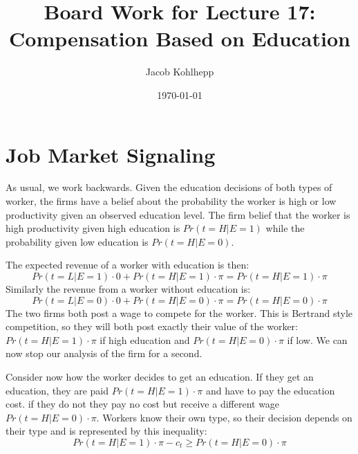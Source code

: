 \documentclass{article}
\title{Board Work for Lecture 17: Compensation Based on Education}
\author{Jacob Kohlhepp}
\date{\today}
\begin{document}
\maketitle


\section{Job Market Signaling}

As usual, we work backwards. Given the education decisions of both types of worker, the firms have a belief about the probability the worker is high or low productivity given an observed education level. The firm belief that the worker is high productivity given high education is $Pr(t=H|E=1)$ while the probability given low education is $Pr(t=H|E=0)$.

The expected revenue of a worker with education is then:
\[Pr(t=L|E=1) \cdot 0 + Pr(t=H|E=1)\cdot \pi =Pr(t=H|E=1)\cdot \pi\]
Similarly the revenue from a worker without education is:
\[Pr(t=L|E=0) \cdot 0 + Pr(t=H|E=0)\cdot \pi =Pr(t=H|E=0)\cdot \pi\]
The two firms both post a wage to compete for the worker. This is Bertrand style competition, so they will both post exactly their value of the worker: $Pr(t=H|E=1)\cdot \pi$ if high education and $Pr(t=H|E=0)\cdot \pi$ if low. We can now stop our analysis of the firm for a second.

Consider now how the worker decides to get an education. If they get an education, they are paid $Pr(t=H|E=1)\cdot \pi$ and have to pay the education cost. if they do not they pay no cost but receive a different wage $Pr(t=H|E=0)\cdot \pi$. Workers know their own type, so their decision depends on their type and is represented by this inequality:
\[Pr(t=H|E=1)\cdot \pi - c_t \geq Pr(t=H|E=0)\cdot \pi\]
\end{document}

